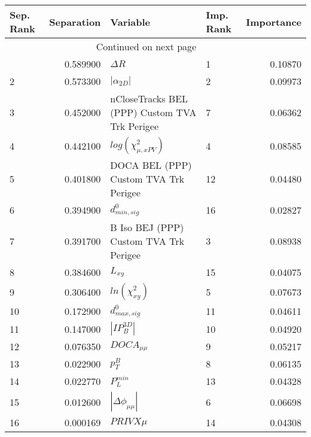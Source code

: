 \usepackage{lscape}

\begin{landscape}
\begin{longtable}{lrllr}
\toprule
Sep. Rank &  Separation &                                       Variable & Imp. Rank &  Importance \\
\midrule
\endhead
\midrule
\multicolumn{3}{r}{{Continued on next page}} \\
\midrule
\endfoot

\bottomrule
\endlastfoot
        1 &    0.589900 &                                     $\Delta R$ &         1 &     0.10870 \\
        2 &    0.573300 &                                $|\alpha_{2D}|$ &         2 &     0.09973 \\
        3 &    0.452000 &  nCloseTracks BEL (PPP) Custom TVA Trk Perigee &         7 &     0.06362 \\
        4 &    0.442100 &                      $log(\chi^{2}_{\mu,xPV})$ &         4 &     0.08585 \\
        5 &    0.401800 &          DOCA BEL (PPP) Custom TVA Trk Perigee &        12 &     0.04480 \\
        6 &    0.394900 &                               $d^0_{min, sig}$ &        16 &     0.02827 \\
        7 &    0.391700 &         B Iso BEJ (PPP) Custom TVA Trk Perigee &         3 &     0.08938 \\
        8 &    0.384600 &                                       $L_{xy}$ &        15 &     0.04075 \\
        9 &    0.306400 &                            $ln(\chi^{2}_{xy})$ &         5 &     0.07673 \\
       10 &    0.172900 &                               $d^0_{max, sig}$ &        11 &     0.04611 \\
       11 &    0.147000 &                                $|IP_{B}^{3D}|$ &        10 &     0.04920 \\
       12 &    0.076350 &                                $DOCA_{\mu\mu}$ &         9 &     0.05217 \\
       13 &    0.022900 &                                      $p^B_{T}$ &         8 &     0.06135 \\
       14 &    0.022770 &                                  $P^{min}_{L}$ &        13 &     0.04328 \\
       15 &    0.012600 &                       $|\Delta \phi_{\mu\mu}|$ &         6 &     0.06698 \\
       16 &    0.000169 &                                     $PRIVX\mu$ &        14 &     0.04308 \\
\end{longtable}

\end{landscape}
